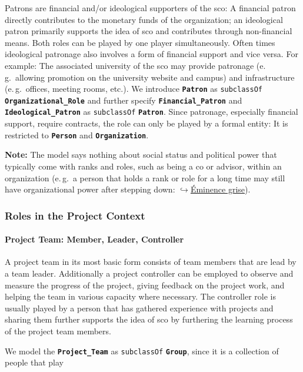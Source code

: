 \documentclass[a4paper, DIV=13, BCOR=0cm]{scrbook}
\newcommand{\eg}{e.\,g.\ }
\newcommand{\class}[1]{\texttt{\textbf{#1}}}
\newcommand{\relation}[1]{\texttt{#1}}
\newcommand{\link}[2]{\href{#1}{$\hookrightarrow$#2}}
\begin{document}
Patrons are financial and/or ideological supporters of the \gls{sco}: A financial patron directly contributes to the monetary funds of the organization; an ideological patron primarily supports the idea of \gls{sco} and contributes through non-financial means. Both roles can be played by one player simultaneously. Often times ideological patronage also involves a form of financial support and vice versa. For example: The associated university of the \gls{sco} may provide patronage (\eg allowing promotion on the university website and campus) and infrastructure (\eg offices, meeting rooms, etc.). We introduce \class{Patron} as \relation{subclassOf} \class{Organizational\_Role} and further specify \class{Financial\_Patron} and \class{Ideological\_Patron} as \relation{subclassOf} \class{Patron}. Since patronage, especially financial support, require contracts, the role can only be played by a formal entity: It is restricted to \class{Person} and \class{Organization}.

\begin{mdframed}
	\textbf{Note:} The model says nothing about social status and political power that typically come with ranks and roles, such as being a \gls{co} or advisor, within an organization (\eg a person that holds a rank or role for a long time may still have organizational power after stepping down: \link{https://en.wikipedia.org/wiki/Éminence_grise}{Éminence grise}).
\end{mdframed}

\subsubsection{Roles in the Project Context}
\paragraph{Project Team: Member, Leader, Controller}
A project team in its most basic form consists of team members that are lead by a team leader. Additionally a project controller can be employed to observe and measure the progress of the project, giving feedback on the project work, and helping the team in various capacity where necessary. The controller role is usually played by a person that has gathered experience with projects and sharing them further supports the idea of \gls{sco} by furthering the learning process of the project team members.

We model the \class{Project\_Team} as \relation{subclassOf} \class{Group}, since it is a collection of people that play 
\end{document}
